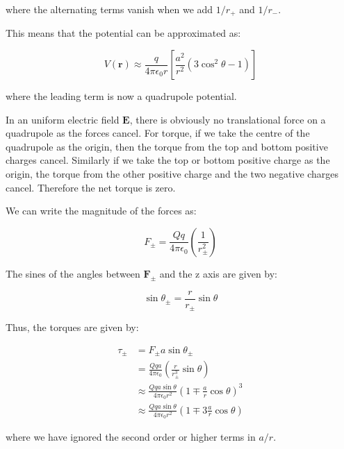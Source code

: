 \documentclass[12pt]{article}
\begin{document}
where the alternating terms vanish when we add $1/r_{+}$ and $1/r_{-}$.

This means that the potential can be approximated as:

\begin{equation}
    V(\mathbf{r}) \approx \frac{q}{4\pi\epsilon_{0}r} \left[ \frac{a^{2}}{r^{2}} \left( 3 \cos^{2}{\theta} - 1 \right) \right]
\end{equation}

where the leading term is now a quadrupole potential.

In an uniform electric field $\mathbf{E}$, there is obviously no translational force on a quadrupole as the forces cancel. For torque, if we take the centre of the quadrupole as the origin, then the torque from the top and bottom positive charges cancel. Similarly if we take the top or bottom positive charge as the origin, the torque from the other positive charge and the two negative charges cancel. Therefore the net torque is zero.

We can write the magnitude of the forces as:

\begin{equation}
    F_{\pm} = \frac{Qq}{4\pi\epsilon_{0}} \left( \frac{1}{r_{\pm}^{2}} \right)
\end{equation}

The sines of the angles between $\mathbf{F}_{\pm}$ and the z axis are given by:

\begin{equation}
    \sin{\theta_{\pm}} = \frac{r}{r_{\pm}} \sin{\theta}
\end{equation}

Thus, the torques are given by:

\begin{equation}
    \begin{split}
        \tau_{\pm} &= F_{\pm} a \sin{\theta_{\pm}} \\
        &= \frac{Qqa}{4\pi\epsilon_{0}} \left( \frac{r}{r_{\pm}^{3}} \sin{\theta} \right) \\
        &\approx \frac{Qqa\sin{\theta}}{4\pi\epsilon_{0}r^{2}} \left( 1 \mp \frac{a}{r} \cos{\theta} \right)^{3} \\
        &\approx \frac{Qqa\sin{\theta}}{4\pi\epsilon_{0}r^{2}} \left( 1 \mp 3\frac{a}{r} \cos{\theta} \right)
    \end{split}
\end{equation}

where we have ignored the second order or higher terms in $a/r$.
\end{document}
